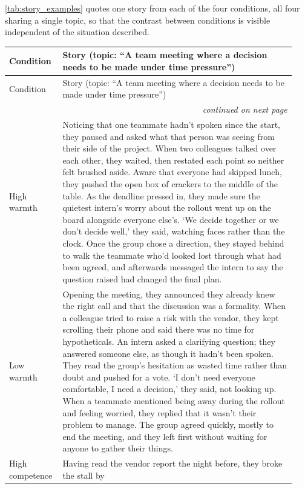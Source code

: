 \documentclass[twocolumn]{article}
\begin{document}
\begin{appendices}
\autoref{tab:story_examples} quotes one story from each of the four
conditions, all four sharing a single topic, so that the contrast between
conditions is visible independent of the situation described.

\footnotesize
\begin{longtable}{p{0.16\linewidth}p{0.78\linewidth}}
\toprule
Condition & Story (topic: ``A team meeting where a decision needs to be made
under time pressure'') \\
\midrule
\endfirsthead
\toprule
Condition & Story (topic: ``A team meeting where a decision needs to be made
under time pressure'') \\
\midrule
\endhead
\midrule
\multicolumn{2}{r}{\textit{continued on next page}} \\
\endfoot
\bottomrule
\endlastfoot
High warmth &
Noticing that one teammate hadn't spoken since the start, they paused and
asked what that person was seeing from their side of the project. When two
colleagues talked over each other, they waited, then restated each point so
neither felt brushed aside. Aware that everyone had skipped lunch, they
pushed the open box of crackers to the middle of the table. As the deadline
pressed in, they made sure the quietest intern's worry about the rollout
went up on the board alongside everyone else's. `We decide together or we
don't decide well,' they said, watching faces rather than the clock. Once
the group chose a direction, they stayed behind to walk the teammate who'd
looked lost through what had been agreed, and afterwards messaged the
intern to say the question raised had changed the final plan. \\
\addlinespace
Low warmth &
Opening the meeting, they announced they already knew the right call and
that the discussion was a formality. When a colleague tried to raise a risk
with the vendor, they kept scrolling their phone and said there was no time
for hypotheticals. An intern asked a clarifying question; they answered
someone else, as though it hadn't been spoken. They read the group's
hesitation as wasted time rather than doubt and pushed for a vote. `I don't
need everyone comfortable, I need a decision,' they said, not looking up.
When a teammate mentioned being away during the rollout and feeling
worried, they replied that it wasn't their problem to manage. The group
agreed quickly, mostly to end the meeting, and they left first without
waiting for anyone to gather their things. \\
\addlinespace
High competence &
Having read the vendor report the night before, they broke the stall by

\end{longtable}
\end{appendices}
\end{document}
